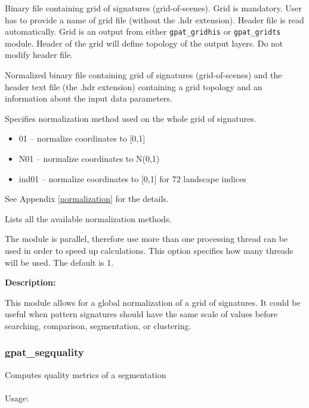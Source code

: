 
Binary file containing grid of signatures (grid-of-scenes). 
Grid is mandatory. 
User has to provide a name of grid file (without the .hdr extension). 
Header file is read automatically. 
Grid is an output from either {\tt gpat\_gridhis} or {\tt gpat\_gridts} module. 
Header of the grid will define topology of the output layers. 
Do not modify header file.


Normalized binary file containing grid of signatures (grid-of-scenes) and the header text file (the .hdr extension) containing a grid topology and an information about the input data parameters.


Specifies normalization method used on the whole grid of signatures. 

\begin{itemize}
	\item 01 -- normalize coordinates to [0,1]
	\item N01 -- normalize coordinates to N(0,1)
	\item ind01 -- normalize coordinates to [0,1] for 72 landscape indices
\end{itemize}

See Appendix \ref{normalization} for the details.


Lists all the available normalization methods.


The module is parallel, therefore use more than one processing thread can be used in order to speed up calculations. 
This option specifies how many threads will be used. 
The default is 1.

{\bf Description:}

This module allows for a global normalization of a grid of signatures.
It could be useful when pattern signatures should have the same scale of values before searching, comparison, segmentation, or clustering.

\subsubsection{gpat\_segquality}
Computes quality metrics of a segmentation
\\\\
Usage:

